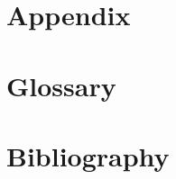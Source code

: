 \newpage


\section{Appendix}\label{sec:appendix}

\newpage


\section{Glossary}\label{sec:glossary}

\printglossary[type=\acronymtype]

\printglossary

\newpage


\section{Bibliography}\label{sec:bibliography}


